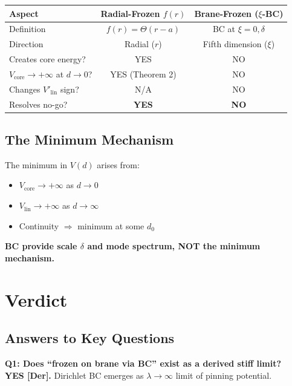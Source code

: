 \documentclass[11pt,a4paper]{article}
\begin{document}
\begin{center}
\begin{tabular}{@{}lcc@{}}
\toprule
Aspect & Radial-Frozen $f(r)$ & Brane-Frozen ($\xi$-BC) \\
\midrule
Definition & $f(r) = \Theta(r-a)$ & BC at $\xi = 0, \delta$ \\
Direction & Radial ($r$) & Fifth dimension ($\xi$) \\
Creates core energy? & YES & NO \\
$V_{\text{core}} \to +\infty$ at $d\to 0$? & YES (Theorem 2) & NO \\
Changes $V'_{\text{lin}}$ sign? & N/A & NO \\
Resolves no-go? & \textbf{YES} & \textbf{NO} \\
\bottomrule
\end{tabular}
\end{center}

\subsection{The Minimum Mechanism}

The minimum in $V(d)$ arises from:
\begin{itemize}[nosep]
    \item $V_{\text{core}} \to +\infty$ as $d \to 0$ 
    \item $V_{\text{lin}} \to +\infty$ as $d \to \infty$ 
    \item Continuity $\Rightarrow$ minimum at some $d_0$
\end{itemize}

\textbf{BC provide scale $\delta$ and mode spectrum, NOT the minimum mechanism.}

\section{Verdict}
\label{sec:verdict}

\subsection{Answers to Key Questions}

\textbf{Q1: Does ``frozen on brane via BC'' exist as a derived stiff limit?}\\
\textbf{YES [Der].} Dirichlet BC emerges as $\lambda\to\infty$ limit of pinning potential.
\end{document}
